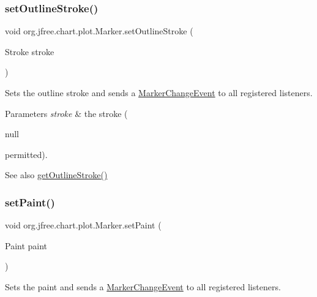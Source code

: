 \subsubsection{\texorpdfstring{set\+Outline\+Stroke()}{setOutlineStroke()}}
{\footnotesize\ttfamily void org.\+jfree.\+chart.\+plot.\+Marker.\+set\+Outline\+Stroke (\begin{DoxyParamCaption}\item[{Stroke}]{stroke }\end{DoxyParamCaption})}

Sets the outline stroke and sends a \mbox{\hyperlink{}{Marker\+Change\+Event}} to all registered listeners.


\begin{DoxyParams}{Parameters}
{\em stroke} & the stroke (
\begin{DoxyCode}
null 
\end{DoxyCode}
 permitted).\\
\hline
\end{DoxyParams}
\begin{DoxySeeAlso}{See also}
\mbox{\hyperlink{classorg_1_1jfree_1_1chart_1_1plot_1_1_marker_abb7e4be1e8ebb8f8a7144217f8abd8d9}{get\+Outline\+Stroke()}} 
\end{DoxySeeAlso}
\mbox{\label{classorg_1_1jfree_1_1chart_1_1plot_1_1_marker_a3c4514961bdf817e6d1ce39f67209dcf}} 
\subsubsection{\texorpdfstring{set\+Paint()}{setPaint()}}
{\footnotesize\ttfamily void org.\+jfree.\+chart.\+plot.\+Marker.\+set\+Paint (\begin{DoxyParamCaption}\item[{Paint}]{paint }\end{DoxyParamCaption})}

Sets the paint and sends a \mbox{\hyperlink{}{Marker\+Change\+Event}} to all registered listeners.


